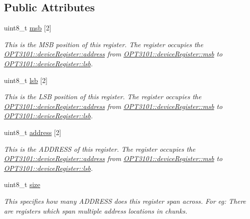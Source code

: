 \subsection*{Public Attributes}
\begin{DoxyCompactItemize}
\item 
uint8\+\_\+t \mbox{\hyperlink{class_o_p_t3101_1_1device_register_a40f9e71d804ae858b6baed1f12b3cf83}{msb}} \mbox{[}2\mbox{]}
\begin{DoxyCompactList}\small\item\em This is the M\+SB position of this register. The register occupies the \mbox{\hyperlink{class_o_p_t3101_1_1device_register_a81d25c717489ac388db0fed33c35bedd}{O\+P\+T3101\+::device\+Register\+::address}} from \mbox{\hyperlink{class_o_p_t3101_1_1device_register_a40f9e71d804ae858b6baed1f12b3cf83}{O\+P\+T3101\+::device\+Register\+::msb}} to \mbox{\hyperlink{class_o_p_t3101_1_1device_register_a404078f369116e10b1cccfbb77c557ca}{O\+P\+T3101\+::device\+Register\+::lsb}}. \end{DoxyCompactList}\item 
uint8\+\_\+t \mbox{\hyperlink{class_o_p_t3101_1_1device_register_a404078f369116e10b1cccfbb77c557ca}{lsb}} \mbox{[}2\mbox{]}
\begin{DoxyCompactList}\small\item\em This is the L\+SB position of this register. The register occupies the \mbox{\hyperlink{class_o_p_t3101_1_1device_register_a81d25c717489ac388db0fed33c35bedd}{O\+P\+T3101\+::device\+Register\+::address}} from \mbox{\hyperlink{class_o_p_t3101_1_1device_register_a40f9e71d804ae858b6baed1f12b3cf83}{O\+P\+T3101\+::device\+Register\+::msb}} to \mbox{\hyperlink{class_o_p_t3101_1_1device_register_a404078f369116e10b1cccfbb77c557ca}{O\+P\+T3101\+::device\+Register\+::lsb}}. \end{DoxyCompactList}\item 
uint8\+\_\+t \mbox{\hyperlink{class_o_p_t3101_1_1device_register_a81d25c717489ac388db0fed33c35bedd}{address}} \mbox{[}2\mbox{]}
\begin{DoxyCompactList}\small\item\em This is the A\+D\+D\+R\+E\+SS of this register. The register occupies the \mbox{\hyperlink{class_o_p_t3101_1_1device_register_a81d25c717489ac388db0fed33c35bedd}{O\+P\+T3101\+::device\+Register\+::address}} from \mbox{\hyperlink{class_o_p_t3101_1_1device_register_a40f9e71d804ae858b6baed1f12b3cf83}{O\+P\+T3101\+::device\+Register\+::msb}} to \mbox{\hyperlink{class_o_p_t3101_1_1device_register_a404078f369116e10b1cccfbb77c557ca}{O\+P\+T3101\+::device\+Register\+::lsb}}. \end{DoxyCompactList}\item 
uint8\+\_\+t \mbox{\hyperlink{class_o_p_t3101_1_1device_register_a058d48b4c23e22739b1c65d85367a0a8}{size}}
\begin{DoxyCompactList}\small\item\em This specifies how many A\+D\+D\+R\+E\+SS does this register span across. For eg\+: There are registers which span multiple address locations in chunks. \end{DoxyCompactList}\end{DoxyCompactItemize}


